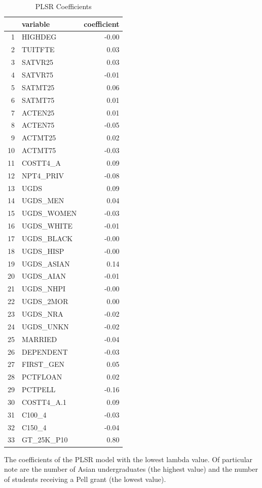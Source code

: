 \documentclass{article}
\begin{document}
\begin{table}[ht]
\centering
\begin{tabular}{rlr}
  \hline
 & variable & coefficient \\ 
  \hline
1 & HIGHDEG & -0.00 \\ 
  2 & TUITFTE & 0.03 \\ 
  3 & SATVR25 & 0.03 \\ 
  4 & SATVR75 & -0.01 \\ 
  5 & SATMT25 & 0.06 \\ 
  6 & SATMT75 & 0.01 \\ 
  7 & ACTEN25 & 0.01 \\ 
  8 & ACTEN75 & -0.05 \\ 
  9 & ACTMT25 & 0.02 \\ 
  10 & ACTMT75 & -0.03 \\ 
  11 & COSTT4\_A & 0.09 \\ 
  12 & NPT4\_PRIV & -0.08 \\ 
  13 & UGDS & 0.09 \\ 
  14 & UGDS\_MEN & 0.04 \\ 
  15 & UGDS\_WOMEN & -0.03 \\ 
  16 & UGDS\_WHITE & -0.01 \\ 
  17 & UGDS\_BLACK & -0.00 \\ 
  18 & UGDS\_HISP & -0.00 \\ 
  19 & UGDS\_ASIAN & 0.14 \\ 
  20 & UGDS\_AIAN & -0.01 \\ 
  21 & UGDS\_NHPI & -0.00 \\ 
  22 & UGDS\_2MOR & 0.00 \\ 
  23 & UGDS\_NRA & -0.02 \\ 
  24 & UGDS\_UNKN & -0.02 \\ 
  25 & MARRIED & -0.04 \\ 
  26 & DEPENDENT & -0.03 \\ 
  27 & FIRST\_GEN & 0.05 \\ 
  28 & PCTFLOAN & 0.02 \\ 
  29 & PCTPELL & -0.16 \\ 
  30 & COSTT4\_A.1 & 0.09 \\ 
  31 & C100\_4 & -0.03 \\ 
  32 & C150\_4 & -0.04 \\ 
  33 & GT\_25K\_P10 & 0.80 \\ 
   \hline
\end{tabular}
\caption{PLSR Coefficients} 
\end{table}
The coefficients of the PLSR model with the lowest lambda value. Of particular note are the number of Asian undergraduates (the highest value) and the number of students receiving a Pell grant (the lowest value).
\end{document}
